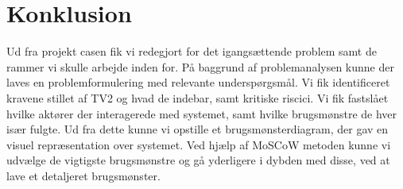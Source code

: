 \section{Konklusion}
Ud fra projekt casen fik vi redegjort for det igangsættende problem samt de rammer vi skulle arbejde inden for. På baggrund af problemanalysen kunne der laves en problemformulering med relevante underspørgsmål. Vi fik identificeret kravene stillet af TV2 og hvad de indebar, samt kritiske riscici. Vi fik fastslået hvilke aktører der interagerede med systemet, samt hvilke brugsmønstre de hver især fulgte. Ud fra dette kunne vi opstille et brugsmønsterdiagram, der gav en visuel repræsentation over systemet.
Ved hjælp af MoSCoW metoden kunne vi udvælge de vigtigste brugsmønstre og gå yderligere i dybden med disse, ved at lave et detaljeret brugsmønster.\\